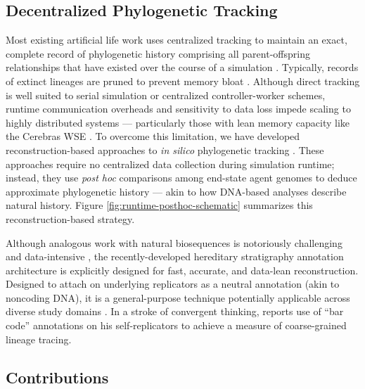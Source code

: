 \subsection{Decentralized Phylogenetic Tracking}



Most existing artificial life work uses centralized tracking to maintain an exact, complete record of phylogenetic history comprising all parent-offspring relationships that have existed over the course of a simulation \citep{ray1992evolution,bohm2017mabe,de2012deap,garwood2019revosim,godin2019apoget,dolson2024phylotrackpy}.
Typically, records of extinct lineages are pruned to prevent memory bloat \citep{moreno2024analysis}.
Although direct tracking is well suited to serial simulation or centralized controller-worker schemes, runtime communication overheads and sensitivity to data loss impede scaling to highly distributed systems --- particularly those with lean memory capacity like the Cerebras WSE \citep{moreno2024analysis}.
To overcome this limitation, we have developed reconstruction-based approaches to \textit{in silico} phylogenetic tracking \citep{moreno2022hereditary}.
These approaches require no centralized data collection during simulation runtime; instead, they use \textit{post hoc} comparisons among end-state agent genomes to deduce approximate phylogenetic history --- akin to how DNA-based analyses describe natural history.
Figure \ref{fig:runtime-posthoc-schematic} summarizes this reconstruction-based strategy.

Although analogous work with natural biosequences is notoriously challenging and data-intensive \citep{neyman1971molecular,lemmon2013high},
the recently-developed hereditary stratigraphy annotation architecture is explicitly designed for fast, accurate, and data-lean reconstruction.
Designed to attach on underlying replicators as a neutral annotation (akin to noncoding DNA), it is a general-purpose technique potentially applicable across diverse study domains \citep{liben2008tracing,cohen1987computer,friggeri2014rumor}.
In a stroke of convergent thinking, \citet{ackley2023robust} reports use of ``bar code'' annotations on his self-replicators to achieve a measure of coarse-grained lineage tracing.

\subsection{Contributions}

